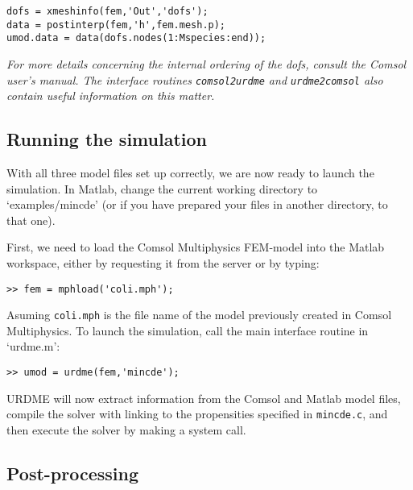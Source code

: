 \begin{enumerate}
\begin{verbatim}
dofs = xmeshinfo(fem,'Out','dofs');
data = postinterp(fem,'h',fem.mesh.p); 
umod.data = data(dofs.nodes(1:Mspecies:end));
\end{verbatim}

\emph{For more details concerning the internal ordering of the dofs,
  consult the Comsol user's manual. The interface routines
  \texttt{comsol2urdme} and \texttt{urdme2comsol} also contain useful
  information on this matter. }


\end{enumerate}

\subsection{Running the simulation}

With all three model files set up correctly, we are now ready to
launch the simulation. In Matlab, change the current working directory
to `examples/mincde' (or if you have prepared your files in another
directory, to that one). 

First, we need to load the Comsol Multiphysics FEM-model into the Matlab
workspace, either by requesting it from the server or by typing:

\begin{verbatim}
>> fem = mphload('coli.mph');
\end{verbatim}

Asuming \texttt{coli.mph} is the file name of the model previously created in Comsol Multiphysics.
To launch the simulation, call the main interface routine in `urdme.m':

\begin{verbatim}
>> umod = urdme(fem,'mincde');
\end{verbatim}

URDME will now extract information from the Comsol and Matlab model
files, compile the solver with linking to the propensities specified in
\texttt{mincde.c}, and then execute the solver by making a system call.

\subsection{Post-processing}

